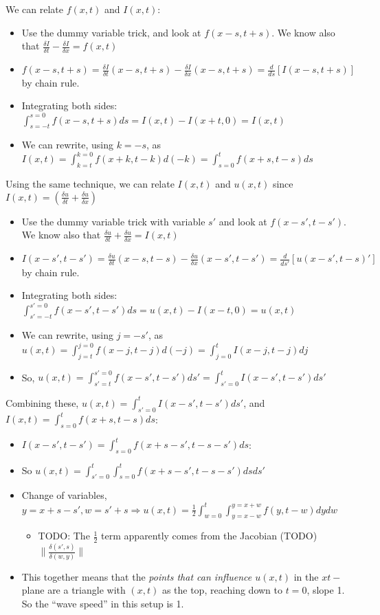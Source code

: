 \documentclass[11pt, oneside]{article}   	%
\begin{document}
We can relate $f(x,t)$ and $I(x,t)$:
\begin{itemize}
\item Use the dummy variable trick, and look at $f(x-s, t+s)$.  We know also that $\frac{\delta I}{\delta t} - \frac{\delta I }{\delta x} = f(x,t)$
\item $f(x-s, t+s) = \frac{\delta I}{\delta t}(x-s,t+s) - \frac{\delta I }{\delta x}(x-s,t+s) = \frac{d}{ds}[I(x-s, t+s)]$ by chain rule.
\item Integrating both sides: $\int_{s=-t}^{s=0} f(x-s, t+s)ds = I(x,t) - I(x+t, 0) = I(x,t)$
\item We can rewrite, using $k=-s$, as $I(x,t) = \int_{k=t}^{k=0} f(x+k, t-k)d(-k) = \int_{s=0}^{t}f(x+s, t-s)ds$ 
\end{itemize}

Using the same technique, we can relate 	$I(x,t)$ and $u(x,t)$ since $I(x,t) = (\frac{\delta u}{\delta t} + \frac{\delta u}{\delta x})$
\begin{itemize}
\item Use the dummy variable trick with variable $s'$ and look at $f(x-s', t-s')$.  We know also that $\frac{\delta u}{\delta t} + \frac{\delta u }{\delta x} = I(x,t)$
\item $I(x-s', t-s') = \frac{\delta u}{\delta t}(x-s,t-s) - \frac{\delta u}{\delta x}(x-s',t-s') = \frac{d}{ds'}[u(x-s', t-s)']$ by chain rule.
\item Integrating both sides: $\int_{s'=-t}^{s'=0} f(x-s', t-s')ds = u(x,t) - I(x-t, 0) = u(x,t)$
\item We can rewrite, using $j=-s'$, as $u(x,t) = \int_{j=t}^{j=0} f(x-j, t-j)d(-j) = \int_{j=0}^{t}I(x-j, t-j)dj$
\item So, $u(x,t) = \int_{s'=t}^{s'=0} f(x-s', t-s')ds' = \int_{s'=0}^{t}I(x-s', t-s')ds'$
\end{itemize}

Combining these, $u(x,t) =  \int_{s'=0}^{t}I(x-s', t-s')ds'$, and $I(x,t) =  \int_{s=0}^{t}f(x+s, t-s)ds$:
\begin{itemize}
\item  $I(x-s', t-s') =  \int_{s=0}^{t}f(x+s-s', t-s-s')ds$:
\item So $u(x,t) =  \int_{s'=0}^{t}  \int_{s=0}^{t}f(x+s-s', t-s-s')dsds'$
\item Change of variables, $y= x+s-s', w = s' + s \Rightarrow u(x,t) = \frac{1}{2} \int_{w=0}^t \int_{y=x-w}^{y=x+w} f(y, t-w)dydw$
\begin{itemize}
\item TODO: The $\frac{1}{2}$ term apparently comes from the Jacobian (TODO) $\| \frac{\delta(s', s)}{\delta (w,y)}\|$
\end{itemize}
\item This together means that the \emph{points that can influence $u(x,t)$} in the $xt-$plane are a triangle with $(x,t)$ as the top, reaching down to $t=0$, slope 1.  So the ``wave speed'' in this setup is 1.
\end{itemize}
\end{document}
